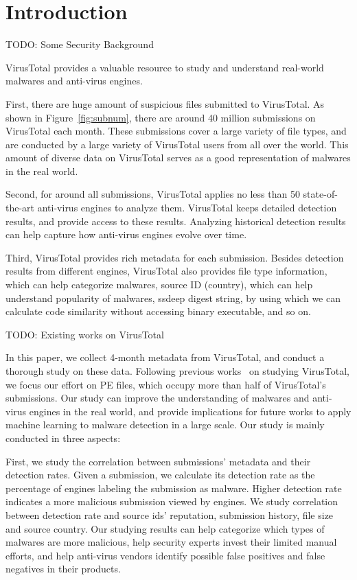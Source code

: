 \section{Introduction}
\label{sec:intro}



{\color{red} TODO: Some Security Background}



VirusTotal provides a valuable resource to study and 
understand real-world malwares and anti-virus engines. 

First, there are huge amount of suspicious files submitted to VirusTotal. 
As shown in Figure~\ref{fig:subnum}, 
there are around 40 million submissions on VirusTotal each month. 
These submissions cover a large variety of file types, and 
are conducted by a large variety of VirusTotal users from all over the world. 
This amount of diverse data on VirusTotal serves as a good representation of malwares in the real world.  

Second, for around all submissions, 
VirusTotal applies no less than 50 state-of-the-art anti-virus engines to analyze them. 
VirusTotal keeps detailed detection results, and provide access to these results. 
Analyzing historical detection results can help capture how anti-virus engines evolve over time. 

Third, VirusTotal provides rich metadata for each submission. 
Besides detection results from different engines, 
VirusTotal also provides file type information, which can help categorize malwares, 
source ID (country), which can help understand popularity of malwares, 
ssdeep digest string, by using which we can calculate code similarity without accessing binary executable, and so on. 


{\color{red} TODO: Existing works on VirusTotal}



In this paper, we collect 4-month metadata from VirusTotal,
and conduct a thorough study on these data. 
Following previous works~\cite{SongAPsys2016} on studying VirusTotal,
we focus our effort on PE files, 
which occupy more than half of VirusTotal’s submissions.
Our study can improve the understanding of malwares and anti-virus engines in the real world, 
and provide implications for future works to 
apply machine learning to malware detection in a large scale. 
Our study is mainly conducted in three aspects: 


First, we study the correlation between submissions’ metadata and their detection rates. 
Given a submission, 
we calculate its detection rate as the percentage of engines 
labeling the submission as malware. 
Higher detection rate indicates a more malicious submission viewed by engines.  
We study correlation between detection rate 
and source ids’ reputation, submission history, file size and source country. 
Our studying results can help categorize which types of malwares are more malicious, 
help security experts invest their limited manual efforts, 
and help anti-virus vendors identify possible false positives and false negatives in their products.   



